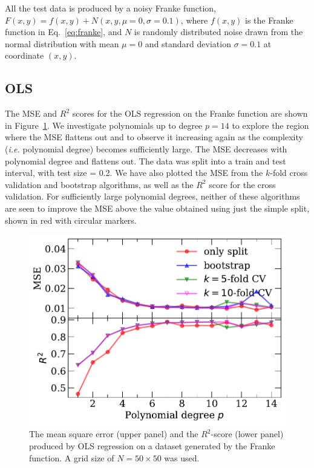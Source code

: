 \documentclass[a4paper, 
amsfonts, 
amssymb, 
amsmath, 
reprint, 
showkeys, 
nofootinbib, 
twoside]{revtex4-2}
\begin{document}
All the test data is produced by a noisy Franke function, $F (x, y) = f(x, y) + N(x, y, \mu =  0, \sigma = 0.1)$, where $f(x,y)$ is the Franke function in Eq.~\eqref{eq:franke}, and $N$ is randomly distributed noise drawn from the normal distribution with mean $\mu = 0$ and standard deviation $\sigma = 0.1$ at coordinate $(x, y)$.

\subsection{OLS}

The MSE and $R^2$ scores for the OLS regression on the Franke function are shown in Figure~\ref{fig:ols_mse}. We investigate polynomials up to degree $p = 14$ to explore the region where the MSE flattens out and to observe it increasing again as the complexity (\textit{i.e.} polynomial degree) becomes sufficiently large. The MSE decreases with polynomial degree and flattens out. The data was split into a train and test interval, with test size = 0.2. We have also plotted the MSE from the $k$-fold cross validation and bootstrap algorithms, as well as the $R^2$ score for the cross validation. For sufficiently large polynomial degrees, neither of these algorithms are seen to improve the MSE above the value obtained using just the simple split, shown in red with circular markers.

\begin{figure} [h!]
    \centering
    \includegraphics[width = \linewidth]{Figures/ols_stat.pdf}
    \caption{The mean square error (upper panel) and the $R^2$-score (lower panel) produced by OLS regression on a dataset generated by the Franke function. A grid size of $N = 50 \times 50$ was used.}
    \label{fig:ols_mse}
\end{figure}
\end{document}

